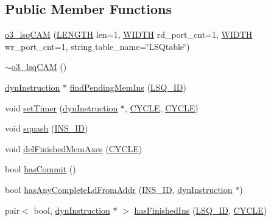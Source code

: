 \subsection*{Public Member Functions}
\begin{DoxyCompactItemize}
\item 
\hyperlink{classo3__lsqCAM_a834f3e822c9d236ae72c40316f43b693}{o3\_\-lsqCAM} (\hyperlink{global_2global_8h_ad7ec63c69447a2b630929c8e0197860d}{LENGTH} len=1, \hyperlink{global_2global_8h_a6fa2e24b8a418fa215e183264cbea3aa}{WIDTH} rd\_\-port\_\-cnt=1, \hyperlink{global_2global_8h_a6fa2e24b8a418fa215e183264cbea3aa}{WIDTH} wr\_\-port\_\-cnt=1, string table\_\-name=\char`\"{}LSQtable\char`\"{})
\item 
\hyperlink{classo3__lsqCAM_a5bc53f5f972f4d902325bc702efe8491}{$\sim$o3\_\-lsqCAM} ()
\item 
\hyperlink{classdynInstruction}{dynInstruction} $\ast$ \hyperlink{classo3__lsqCAM_a7db68789c8d9af13bbc9ec485b4972bc}{findPendingMemIns} (\hyperlink{o3_2lsq_8h_a3bb5a7f1114a20672e012bf0dfe5fb24}{LSQ\_\-ID})
\item 
void \hyperlink{classo3__lsqCAM_a12159149dc0b13cda6edfb1213ce6197}{setTimer} (\hyperlink{classdynInstruction}{dynInstruction} $\ast$, \hyperlink{global_2global_8h_a7e19a550ec11d1ed921deb20c22efb5b}{CYCLE}, \hyperlink{global_2global_8h_a7e19a550ec11d1ed921deb20c22efb5b}{CYCLE})
\item 
void \hyperlink{classo3__lsqCAM_a95e286b95f3651e40d57206eb2a41308}{squash} (\hyperlink{global_2global_8h_a1883c47d0023d0f200e1d86eced6a070}{INS\_\-ID})
\item 
void \hyperlink{classo3__lsqCAM_a2aa5dc2ccb76d85e0c8df59a8dfe47f2}{delFinishedMemAxes} (\hyperlink{global_2global_8h_a7e19a550ec11d1ed921deb20c22efb5b}{CYCLE})
\item 
bool \hyperlink{classo3__lsqCAM_ad3d6f79a7377317fc859080d337d428a}{hasCommit} ()
\item 
bool \hyperlink{classo3__lsqCAM_ac3fca99875017c6639bfeccafe904c83}{hasAnyCompleteLdFromAddr} (\hyperlink{global_2global_8h_a1883c47d0023d0f200e1d86eced6a070}{INS\_\-ID}, \hyperlink{classdynInstruction}{dynInstruction} $\ast$)
\item 
pair$<$ bool, \hyperlink{classdynInstruction}{dynInstruction} $\ast$ $>$ \hyperlink{classo3__lsqCAM_aad5ca9d9f84c657635d39de62e1ec32a}{hasFinishedIns} (\hyperlink{o3_2lsq_8h_a3bb5a7f1114a20672e012bf0dfe5fb24}{LSQ\_\-ID}, \hyperlink{global_2global_8h_a7e19a550ec11d1ed921deb20c22efb5b}{CYCLE})
\end{DoxyCompactItemize}


